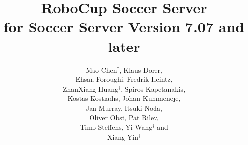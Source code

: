 \documentclass[a4paper,11pt]{scrbook}
\newcommand{\email}[1]{\texttt{$<$#1$>$}}
\begin{document}
\subject{Users Manual}
\title{RoboCup Soccer Server\\
  {\small for Soccer Server Version 7.07 and later}}
\author{Mao Chen$^\dagger$, Klaus Dorer,\\
  Ehsan Foroughi, Fredrik Heintz, \\
  ZhanXiang Huang$^\dagger$, Spiros Kapetanakis,\\
  Kostas Kostiadis, Johan Kummeneje, \\
  Jan Murray, Itsuki Noda, \\
  Oliver Obst, Pat Riley, \\
  Timo Steffens, Yi Wang$^\dagger$ and \\
  Xiang Yin$^\dagger$
 }
\publishers{\small %
  $^\dagger$~\email{ustc9811@sina.com} \\
  \email{klaus.dorer@living-systems.de}\\
  \email{foroughi@ce.sharif.edu} \\
  \email{frehe@ida.liu.se} \\
  \email{spiros@cs.york.ac.uk} \\
  \email{kkosti@essex.ac.uk} \\
  \email{johan.kummeneje@generalwireless.se} \\
  \email{murray@uni-koblenz.de}\\
  \email{noda@etl.go.jp} \\
  \email{fruit@uni-koblenz.de} \\
  \email{pfr+@cs.cmu.edu} \\
  \email{timosteffens@gmx.de}
  }

\lowertitleback{Copyright {\textcopyright} 2001 The RoboCup Federation. Permission is
  granted to copy, distribute and/or modify this document under the
  terms of the GNU Free Documentation License, Version 1.1 or any
  later version published by the Free Software Foundation; with no
  Invariant Sections, with no Front-Cover Texts, and with no
  Back-Cover Texts. A copy of the license is included in the section
  entitled ``GNU Free Documentation License''. }

\maketitle%
\thispagestyle{empty}



\end{document}
